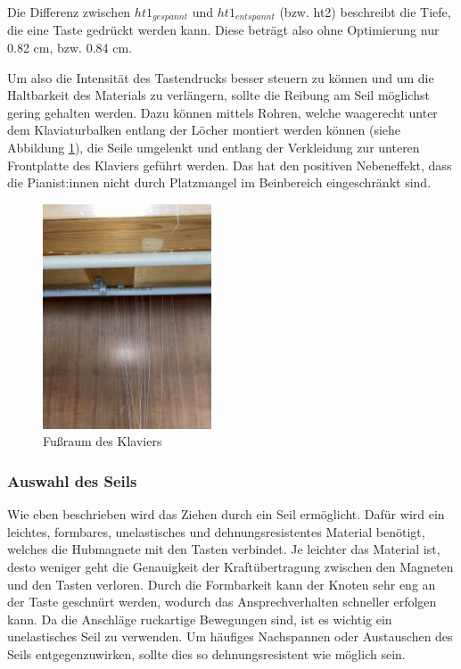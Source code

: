 Die Differenz zwischen $ht1_{gespannt}$ und $ht1_{entspannt}$ (bzw. ht2) beschreibt die Tiefe, die eine Taste gedrückt werden kann.
\newline Diese beträgt also ohne Optimierung nur 0.82 cm, bzw. 0.84 cm. %

Um also die Intensität des Tastendrucks besser steuern zu können und um die Haltbarkeit des Materials zu verlängern,
sollte die Reibung am Seil möglichst gering gehalten werden.
Dazu können mittels Rohren, welche waagerecht unter dem Klaviaturbalken entlang der Löcher montiert werden können (siehe Abbildung \ref{fig:fussraum}), die Seile umgelenkt und
entlang der Verkleidung zur unteren Frontplatte des Klaviers geführt werden.
Das hat den positiven Nebeneffekt, dass die Pianist:innen nicht durch Platzmangel im Beinbereich eingeschränkt sind.


\begin{figure}[htbp]
    \centering
    \includegraphics[width=5cm,angle=-90]{img/Fussraum.jpg}
    \caption{Fußraum des Klaviers}
    \label{fig:fussraum}
\end{figure}


\subsubsection{Auswahl des Seils}

Wie eben beschrieben wird das Ziehen durch ein Seil ermöglicht.
Dafür wird ein leichtes, formbares, unelastisches und dehnungsresistentes Material benötigt, welches die Hubmagnete mit den Tasten verbindet.
Je leichter das Material ist, desto weniger geht die Genauigkeit der Kraftübertragung zwischen den Magneten und den Tasten verloren.
Durch die Formbarkeit kann der Knoten sehr eng an der Taste geschnürt werden, wodurch das Ansprechverhalten schneller erfolgen kann.
Da die Anschläge ruckartige Bewegungen sind, ist es wichtig ein unelastisches Seil zu verwenden.
Um häufiges Nachspannen oder Austauschen des Seils entgegenzuwirken, sollte dies so dehnungsresistent wie möglich sein.

